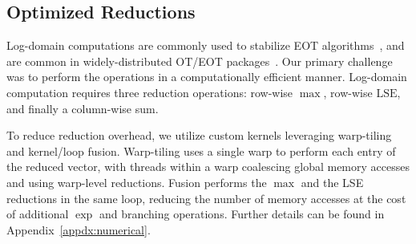 \documentclass[10pt]{article}
\newcommand{\LSE}{\mathrm{LSE}}
\theoremstyle{plain}
\theoremstyle{definition}
\theoremstyle{remark}
\begin{document}
\subsection{Optimized Reductions}\label{subsec:reduction}
Log-domain computations are commonly used to stabilize EOT algorithms~\cite{peyre2019computational,schmitzerStabilizedSparseScaling2019a}, and are common in widely-distributed OT/EOT packages~\cite{flamaryPOTPythonOptimal2021b}. Our primary challenge was to perform the operations in a computationally efficient manner. Log-domain computation requires three reduction operations: row-wise $\max$, row-wise $\LSE$, and finally a column-wise sum.

To reduce reduction overhead, we utilize custom kernels leveraging warp-tiling and kernel/loop fusion. Warp-tiling uses a single warp to perform each entry of the reduced vector, with threads within a warp coalescing global memory accesses and using warp-level reductions. Fusion performs the $\max$ and the LSE reductions in the same loop, reducing the number of memory accesses at the cost of additional $\exp$ and branching operations. Further details can be found in Appendix~\ref{appdx:numerical}.
\end{document}

